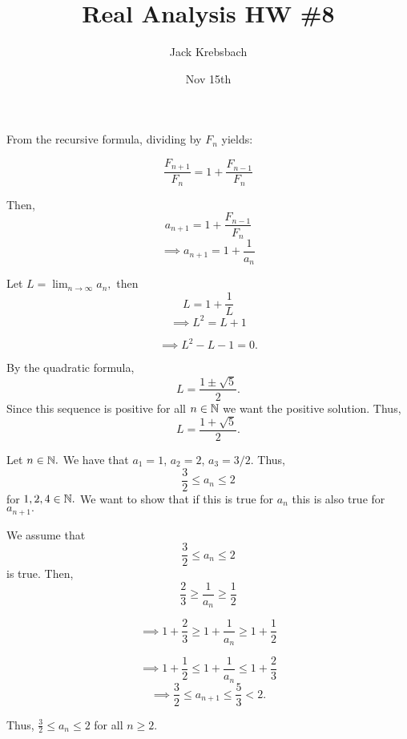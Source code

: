 \documentclass{report}
\title{Real Analysis HW \#8}
\author{Jack Krebsbach }
\date{Nov 15th}
\begin{document}
\maketitle



\sol
From the recursive formula, dividing by $F_n$ yields:

$$\frac{F_{n+1}}{F_n} = 1 + \frac{F_{n-1}}{F_n} $$

Then, $$a_{n+1} = 1 + \frac{F_{n-1}}{F_n}$$
$$ \implies a_{n+1} = 1 + \frac{1}{a_n}$$

Let $L = \lim_{n \rightarrow \infty} a_n,$ then  $$ L = 1 + \frac{1}{L}$$
$$ \implies L^2 = L + 1$$


$$\implies L^2 - L -1=0.$$

By the quadratic formula,  $$L = \frac{ 1 \pm \sqrt{5}}{2}.$$ Since this sequence is positive for all $n \in \NN$  we want the positive solution. Thus, $$L  = \frac{ 1 + \sqrt{5}}{2}.$$



\pagebreak


\begin{myproof}
    
  Let $n\in \NN.$  We have that $a_1 = 1$, $a_2 = 2$, $a_3 = 3/2.$ Thus, $$\frac{3}{2} \leq a_n \leq 2$$ for $1,2,4 \in \NN.$ We want to show that if this is true for $a_n$ this is also true for $a_{n+1}.$

We assume that $$ \frac{3}{2} \leq a_n \leq 2$$ is true.  Then,
$$ \frac{2}{3} \geq \frac{1}{a_n} \geq \frac{1}{2}$$

$$\implies  1+ \frac{2}{3} \geq 1+ \frac{1}{a_n} \geq 1+\frac{1}{2}$$

$$\implies  1+ \frac{1}{2} \leq 1+ \frac{1}{a_n} \leq 1+\frac{2}{3}$$
$$\implies  \frac{3}{2} \leq a_{n+1} \leq \frac{5}{3} < 2.$$

Thus, $\frac{3}{2} \leq a_n \leq 2$ for all  $n \geq 2.$ 
\end{myproof}
\end{document}
